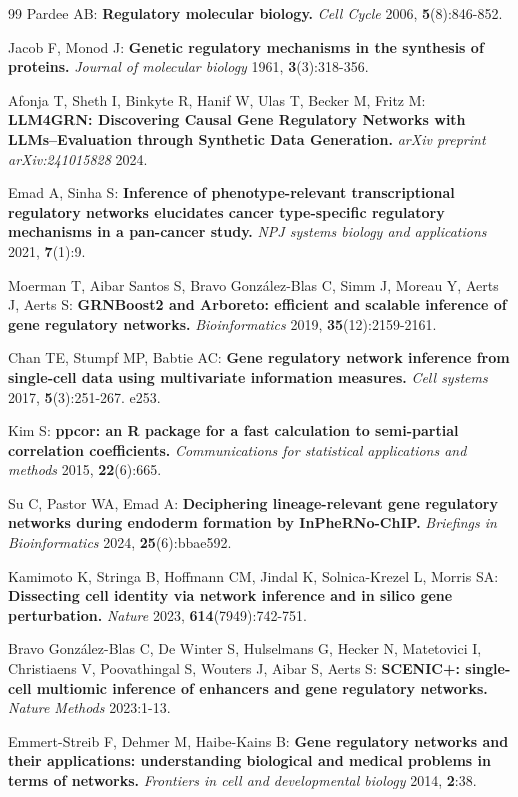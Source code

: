 \begin{tcolorbox}
\begin{singlespace}
\begin{thebibliography}{99\kern\bibindent}
Pardee AB: \textbf{Regulatory molecular biology.} \textit{Cell Cycle} 2006, \textbf{5}(8):846-852.

Jacob F, Monod J: \textbf{Genetic regulatory mechanisms in the synthesis of proteins.} \textit{Journal of molecular biology} 1961, \textbf{3}(3):318-356.

Afonja T, Sheth I, Binkyte R, Hanif W, Ulas T, Becker M, Fritz M: \textbf{LLM4GRN: Discovering Causal Gene Regulatory Networks with LLMs--Evaluation through Synthetic Data Generation.} \textit{arXiv preprint arXiv:241015828} 2024.

Emad A, Sinha S: \textbf{Inference of phenotype-relevant transcriptional regulatory networks elucidates cancer type-specific regulatory mechanisms in a pan-cancer study.} \textit{NPJ systems biology and applications} 2021, \textbf{7}(1):9.

Moerman T, Aibar Santos S, Bravo González-Blas C, Simm J, Moreau Y, Aerts J, Aerts S: \textbf{GRNBoost2 and Arboreto: efficient and scalable inference of gene regulatory networks.} \textit{Bioinformatics} 2019, \textbf{35}(12):2159-2161.

Chan TE, Stumpf MP, Babtie AC: \textbf{Gene regulatory network inference from single-cell data using multivariate information measures.} \textit{Cell systems} 2017, \textbf{5}(3):251-267. e253.

Kim S: \textbf{ppcor: an R package for a fast calculation to semi-partial correlation coefficients.} \textit{Communications for statistical applications and methods} 2015, \textbf{22}(6):665.

Su C, Pastor WA, Emad A: \textbf{Deciphering lineage-relevant gene regulatory networks during endoderm formation by InPheRNo-ChIP.} \textit{Briefings in Bioinformatics} 2024, \textbf{25}(6):bbae592.

Kamimoto K, Stringa B, Hoffmann CM, Jindal K, Solnica-Krezel L, Morris SA: \textbf{Dissecting cell identity via network inference and in silico gene perturbation.} \textit{Nature} 2023, \textbf{614}(7949):742-751.

Bravo González-Blas C, De Winter S, Hulselmans G, Hecker N, Matetovici I, Christiaens V, Poovathingal S, Wouters J, Aibar S, Aerts S: \textbf{SCENIC+: single-cell multiomic inference of enhancers and gene regulatory networks.} \textit{Nature Methods} 2023:1-13.

Emmert-Streib F, Dehmer M, Haibe-Kains B: \textbf{Gene regulatory networks and their applications: understanding biological and medical problems in terms of networks.} \textit{Frontiers in cell and developmental biology} 2014, \textbf{2}:38.


\end{thebibliography}
\end{singlespace}
\end{tcolorbox}
